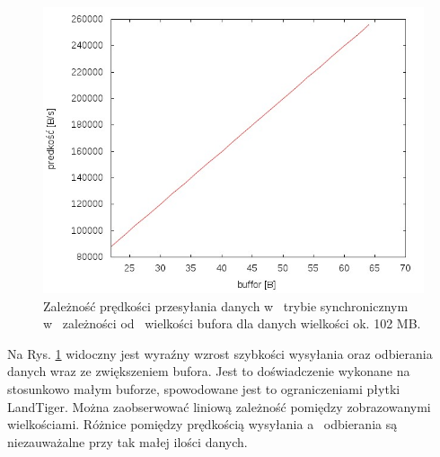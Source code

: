 \documentclass{BscUS}
\begin{document}
\newline
\begin{figure}[H]
{
\centering
\captionsetup{justification=centering}
\includegraphics[width=1\textwidth]{./img/S_107374200Receive}
\caption{Zależność prędkości przesyłania danych w~ trybie synchronicznym w~ zależności od~ wielkości bufora dla danych wielkości ok. 102 MB.}
\label{fig:S_107374200Receive}
}
\end{figure}
\noindent Na Rys. \ref{fig:S_107374200Receive} widoczny jest wyraźny wzrost szybkości wysyłania oraz odbierania danych wraz ze zwiększeniem bufora. Jest to doświadczenie wykonane na stosunkowo małym buforze, spowodowane jest to ograniczeniami płytki LandTiger. Można zaobserwować liniową zależność pomiędzy zobrazowanymi wielkościami. Różnice pomiędzy prędkością wysyłania a~ odbierania są niezauważalne przy tak małej ilości danych.
\end{document}
